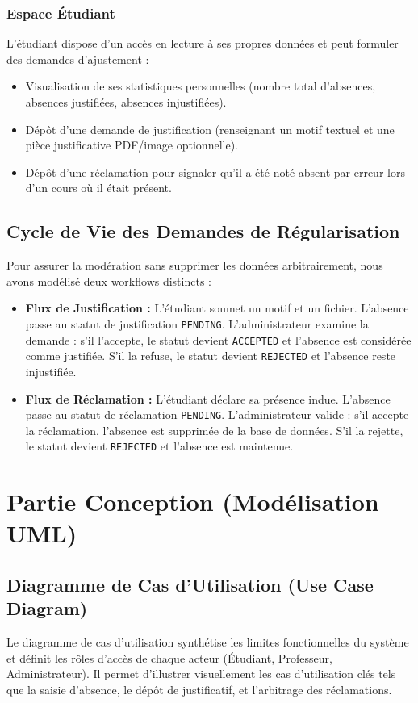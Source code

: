 \documentclass[12pt,a4paper]{article}
\begin{document}
\subsubsection{Espace Étudiant}
L'étudiant dispose d'un accès en lecture à ses propres données et peut formuler des demandes d'ajustement :
\begin{itemize}
    \item Visualisation de ses statistiques personnelles (nombre total d'absences, absences justifiées, absences injustifiées).
    \item Dépôt d'une demande de justification (renseignant un motif textuel et une pièce justificative PDF/image optionnelle).
    \item Dépôt d'une réclamation pour signaler qu'il a été noté absent par erreur lors d'un cours où il était présent.
\end{itemize}

\subsection{Cycle de Vie des Demandes de Régularisation}
Pour assurer la modération sans supprimer les données arbitrairement, nous avons modélisé deux workflows distincts :
\begin{itemize}
    \item \textbf{Flux de Justification :} L'étudiant soumet un motif et un fichier. L'absence passe au statut de justification \texttt{PENDING}. L'administrateur examine la demande : s'il l'accepte, le statut devient \texttt{ACCEPTED} et l'absence est considérée comme justifiée. S'il la refuse, le statut devient \texttt{REJECTED} et l'absence reste injustifiée.
    \item \textbf{Flux de Réclamation :} L'étudiant déclare sa présence indue. L'absence passe au statut de réclamation \texttt{PENDING}. L'administrateur valide : s'il accepte la réclamation, l'absence est supprimée de la base de données. S'il la rejette, le statut devient \texttt{REJECTED} et l'absence est maintenue.
\end{itemize}

\section{Partie Conception (Modélisation UML)}

\subsection{Diagramme de Cas d'Utilisation (Use Case Diagram)}
Le diagramme de cas d'utilisation synthétise les limites fonctionnelles du système et définit les rôles d'accès de chaque acteur (Étudiant, Professeur, Administrateur). Il permet d'illustrer visuellement les cas d'utilisation clés tels que la saisie d'absence, le dépôt de justificatif, et l'arbitrage des réclamations.
\end{document}
